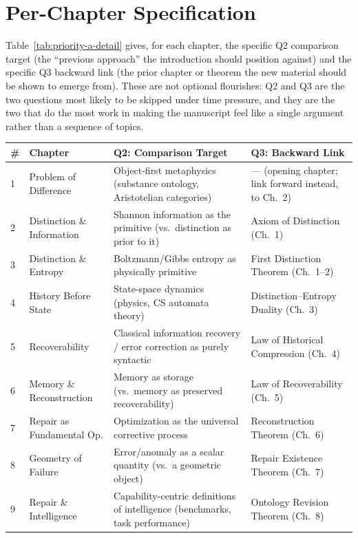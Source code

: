 \documentclass[11pt]{report}
\begin{document}
\section{Per-Chapter Specification}
\label{sec:priority-a-perchapter}

Table~\ref{tab:priority-a-detail} gives, for each chapter, the
specific Q2 comparison target (the ``previous approach'' the
introduction should position against) and the specific Q3
backward link (the prior chapter or theorem the new material
should be shown to emerge from). These are not optional
flourishes: Q2 and Q3 are the two questions most likely to be
skipped under time pressure, and they are the two that do the
most work in making the manuscript feel like a single argument
rather than a sequence of topics.

\begin{longtable}{@{}p{0.4cm}p{3.6cm}p{5.6cm}p{5.6cm}@{}}
\toprule
\# & Chapter & Q2: Comparison Target & Q3: Backward Link \\
\midrule
\endhead
1 & Problem of Difference & Object-first metaphysics (substance ontology, Aristotelian categories) & --- (opening chapter; link forward instead, to Ch.~2) \\
2 & Distinction \& Information & Shannon information as the primitive (vs.\ distinction as prior to it) & Axiom of Distinction (Ch.~1) \\
3 & Distinction \& Entropy & Boltzmann/Gibbs entropy as physically primitive & First Distinction Theorem (Ch.~1--2) \\
4 & History Before State & State-space dynamics (physics, CS automata theory) & Distinction--Entropy Duality (Ch.~3) \\
5 & Recoverability & Classical information recovery / error correction as purely syntactic & Law of Historical Compression (Ch.~4) \\
6 & Memory \& Reconstruction & Memory as storage (vs.\ memory as preserved recoverability) & Law of Recoverability (Ch.~5) \\
7 & Repair as Fundamental Op. & Optimization as the universal corrective process & Reconstruction Theorem (Ch.~6) \\
8 & Geometry of Failure & Error/anomaly as a scalar quantity (vs.\ a geometric object) & Repair Existence Theorem (Ch.~7) \\
9 & Repair \& Intelligence & Capability-centric definitions of intelligence (benchmarks, task performance) & Ontology Revision Theorem (Ch.~8) \\

\end{longtable}
\end{document}
